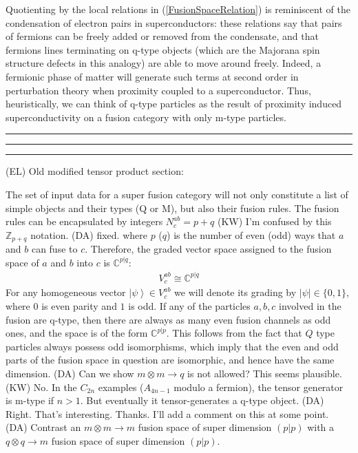 \documentclass[12pt,a4paper]{article}
\newcounter{arrow}
\newcommand{\tp}{\otimes}
\newcommand{\zz}{\mathbb{Z}}
\newcommand{\ket}[1]{\ensuremath{\left|#1\right\rangle}}
\newcommand{\dave}[1]{{\color{ao(english)}\footnotesize{(DA) #1}}}
\newcommand{\ethan}[1]{{\color{amethyst}\footnotesize{(EL) #1}}}
\newcommand{\kw}[1]{{\color{kwcolor}\footnotesize{(KW) #1}}}
\newcommand{\kwsep}{\bigskip\hrule\medskip\hrule\medskip\hrule\bigskip}
\begin{document}
Quotienting by the local relations in (\ref{FusionSpaceRelation}) is reminiscent of the condensation of electron pairs in superconductors: these relations say that pairs of fermions can be freely added or removed from the condensate, and that fermions lines terminating on q-type objects (which are the Majorana spin structure defects in this analogy) are able to move around freely. 
Indeed, a fermionic phase of matter will generate such terms at second order in perturbation theory when proximity coupled to a superconductor.
Thus, heuristically, we can think of q-type particles as the result of proximity induced superconductivity on a fusion category with only m-type particles.


\kwsep

\ethan{Old modified tensor product section:}

The set of input data for a super fusion category will not only constitute a list of simple objects and their types (Q or M), but also their fusion rules. 
The fusion rules can be encapsulated by integers $N_c^{ab} = p+q$ 
\kw{I'm confused by this $\zz_{p+q}$ notation.}
\dave{fixed.}
where $p$ ($q$) is the number of even (odd) ways that $a$ and $b$ can fuse to $c$.
Therefore, the graded vector space assigned to the fusion space of $a$ and $b$ into $c$ is $\mathbb{C}^{p|q}$:
\begin{align}
V^{ab}_c \cong \mathbb{C}^{p|q}
\end{align}
For any homogeneous vector $\ket{\psi} \in V^{ab}_c$ 
we will denote its grading by $|\psi| \in \{ 0, 1\}$, where $0$ is even parity and $1$ is odd.
If any of the particles $a,b,c$ involved in the fusion are q-type, then there are always as many even fusion channels as odd ones, and the space is of the form $\mathbb{C}^{p|p}$.
This follows from the fact that $Q$ type particles always possess odd isomorphisms, which imply that the even and odd parts of the fusion space in question are isomorphic, and hence have the same dimension. 
\dave{Can we show $m \tp m \rightarrow q$ is not allowed? This seems plausible.}
\kw{No.  In the $C_{2n}$ examples ($A_{4n-1}$ modulo a fermion), the tensor generator is m-type if $n > 1$.
But eventually it tensor-generates a q-type object.}
\dave{Right. That's interesting. Thanks. I'll add a comment on this at some point.}
\dave{Contrast an $m \tp m \rightarrow m$ fusion space of super dimension $(p|p)$ with a $q \tp q \rightarrow m$ fusion space of super dimension $(p|p)$.}
\end{document}
